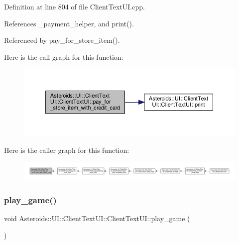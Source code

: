 Definition at line 804 of file Client\+Text\+U\+I.\+cpp.



References \+\_\+payment\+\_\+helper, and print().



Referenced by pay\+\_\+for\+\_\+store\+\_\+item().

Here is the call graph for this function\+:
\nopagebreak
\begin{figure}[H]
\begin{center}
\leavevmode
\includegraphics[width=350pt]{classAsteroids_1_1UI_1_1ClientTextUI_1_1ClientTextUI_a02d420d49c44459fe7a2af9b0000adf9_cgraph}
\end{center}
\end{figure}
Here is the caller graph for this function\+:
\nopagebreak
\begin{figure}[H]
\begin{center}
\leavevmode
\includegraphics[width=350pt]{classAsteroids_1_1UI_1_1ClientTextUI_1_1ClientTextUI_a02d420d49c44459fe7a2af9b0000adf9_icgraph}
\end{center}
\end{figure}
\mbox{\label{classAsteroids_1_1UI_1_1ClientTextUI_1_1ClientTextUI_aa0cb16ae0f3edc7efed1ec8c5d7bf94d}} 
\subsubsection{\texorpdfstring{play\+\_\+game()}{play\_game()}}
{\footnotesize\ttfamily void Asteroids\+::\+U\+I\+::\+Client\+Text\+U\+I\+::\+Client\+Text\+U\+I\+::play\+\_\+game (\begin{DoxyParamCaption}{ }\end{DoxyParamCaption})\hspace{0.3cm}{\ttfamily [private]}}



